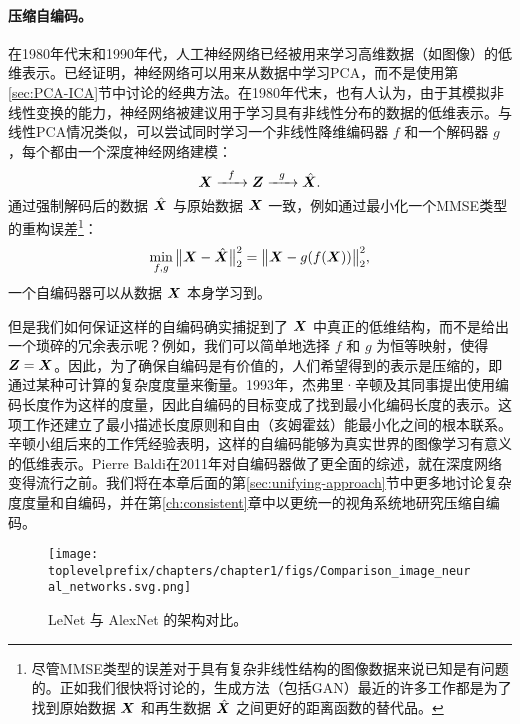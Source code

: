 \documentclass[../../book-main_zh.tex]{subfiles}
\begin{document}
\paragraph{压缩自编码。}
在1980年代末和1990年代，人工神经网络已经被用来学习高维数据（如图像）的低维表示。已经证明，神经网络可以用来从数据中学习PCA\cite{Oja1982SimplifiedNM,Baldi89}，而不是使用第\ref{sec:PCA-ICA}节中讨论的经典方法。在1980年代末，也有人认为，由于其模拟非线性变换的能力，神经网络被建议用于学习具有非线性分布的数据的低维表示。与线性PCA情况类似，可以尝试同时学习一个非线性降维编码器 $f$ 和一个解码器 $g$，每个都由一个深度神经网络建模\cite{Rumelhart1986,Kramer1991NonlinearPC}：
\begin{equation}
    \bm{X}   \xrightarrow{\hspace{2mm} f \hspace{2mm}} \bm{Z}  \xrightarrow{\hspace{2mm} g \hspace{2mm}} \hat {\bm{X}}.
       \label{eqn:auto-encoding-deep-networks}
\end{equation}
通过强制解码后的数据 $\hat {\bm{X}}$ 与原始数据 $\bm{X}$ 一致，例如通过最小化一个MMSE类型的重构误差\footnote{尽管MMSE类型的误差对于具有复杂非线性结构的图像数据来说已知是有问题的。正如我们很快将讨论的，生成方法（包括GAN）最近的许多工作都是为了找到原始数据 $\bm{X}$ 和再生数据 $\hat {\bm{X}}$ 之间更好的距离函数的替代品。}：
\begin{equation}
    \min_{f,g} \big\|\bm{X} - \hat {\bm{X}}\big\|_2^2 = \big\|\bm{X} - g(f( \bm{X}))\big\|_2^2,
\end{equation}
一个自编码器可以从数据 $\bm{X}$ 本身学习到。

但是我们如何保证这样的自编码确实捕捉到了 $\bm{X}$ 中真正的低维结构，而不是给出一个琐碎的冗余表示呢？例如，我们可以简单地选择 $f$ 和 $g$ 为恒等映射，使得 $\bm{Z} = \bm{X}$。因此，为了确保自编码是有价值的，人们希望得到的表示是压缩的，即通过某种可计算的复杂度度量来衡量。1993年，杰弗里·辛顿及其同事提出使用编码长度作为这样的度量，因此自编码的目标变成了找到最小化编码长度的表示\cite{Hinton-1993}。这项工作还建立了最小描述长度原则\cite{Rissanen-1978}和自由（亥姆霍兹）能最小化之间的根本联系。辛顿小组后来的工作\cite{Hinton504}凭经验表明，这样的自编码能够为真实世界的图像学习有意义的低维表示。Pierre Baldi在2011年对自编码器做了更全面的综述\cite{Baldi2011}，就在深度网络变得流行之前。我们将在本章后面的第\ref{sec:unifying-approach}节中更多地讨论复杂度度量和自编码，并在第\ref{ch:consistent}章中以更统一的视角系统地研究压缩自编码。


\begin{figure}
    \centering
    \texttt{[image: \\toplevelprefix/chapters/chapter1/figs/Comparison\_image\_neural\_networks.svg.png]}
    \caption{LeNet \cite{LeCun-1989} 与 AlexNet \cite{krizhevsky2012imagenet} 的架构对比。}
    \label{fig:LeNet-AlexNet}
\end{figure}
\end{document}
